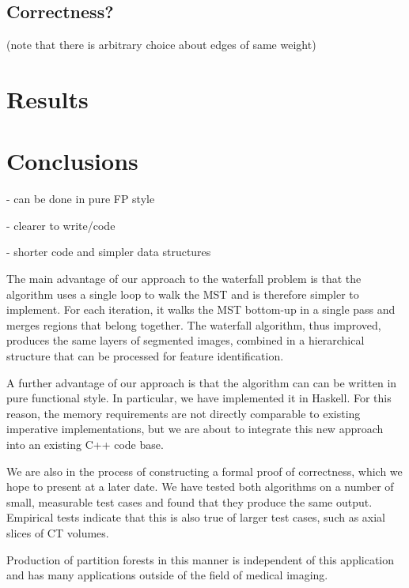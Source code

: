\documentclass{jfp}
\begin{document}
\subsection{Correctness?}

(note that there is arbitrary choice about edges of same weight)


\section{Results}


\section{Conclusions}

 - can be done in pure FP style

 - clearer to write/code

 - shorter code and simpler data structures


The main advantage of our approach to the waterfall problem is that
the algorithm uses a single loop to walk the MST and is therefore
simpler to implement. For each iteration, it walks the MST bottom-up
in a single pass and merges regions that belong together. The
waterfall algorithm, thus improved, produces the same layers of
segmented images, combined in a hierarchical structure that can be
processed for feature identification.

A further advantage of our approach is that the algorithm can can be
written in pure functional style. In particular, we have implemented
it in Haskell. For this reason, the memory requirements are not
directly comparable to existing imperative implementations, but we are
about to integrate this new approach into an existing C++ code base.

We are also in the process of constructing a formal proof of
correctness, which we hope to present at a later date. We have tested
both algorithms on a number of small, measurable test cases and found
that they produce the same output. Empirical tests indicate that this
is also true of larger test cases, such as axial slices of CT volumes.

Production of partition forests in this manner is independent of this
application and has many applications outside of the field of medical
imaging.

\end{document}
